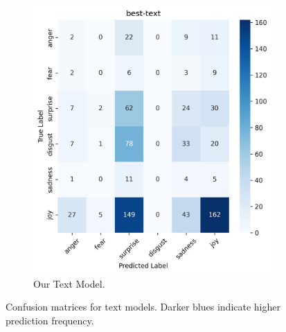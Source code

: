 \begin{figure}[ht]
\begin{subfigure}[b]{0.48\textwidth}
        \includegraphics[width=\textwidth]{images/confusion_matrix_best_text_dist.png}
        \caption{Our Text Model.}
        \label{fig:text-confusion-best}
    \end{subfigure}
    \caption{Confusion matrices for text models. Darker blues indicate higher prediction frequency.}
    \label{fig:text-confusion}
\end{figure}

